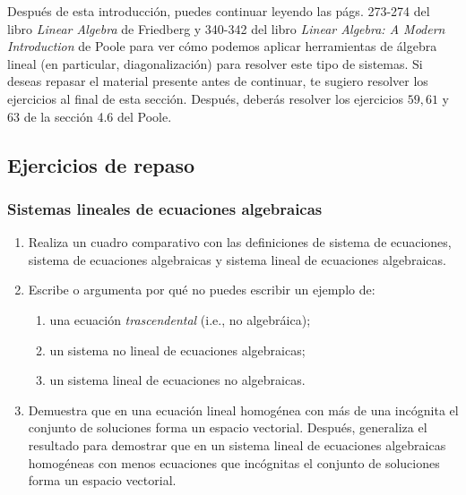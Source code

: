 \documentclass[12pt,libertine]{book}
\begin{document}
Después de esta introducción, puedes continuar leyendo las págs. 273-274 del libro \emph{Linear Algebra} de Friedberg y 340-342 del libro \emph{Linear Algebra: A Modern Introduction} de Poole para ver cómo podemos aplicar herramientas de álgebra lineal (en particular, diagonalización) para resolver este tipo de sistemas. Si deseas repasar el material presente antes de continuar, te sugiero resolver los ejercicios al final de esta sección. Después, deberás resolver los ejercicios $59, 61$ y $63$ de la sección 4.6 del Poole.

\subsection*{Ejercicios de repaso}

\subsubsection*{Sistemas lineales de ecuaciones algebraicas}
\begin{enumerate}
    \item Realiza un cuadro comparativo con las definiciones de sistema de ecuaciones, sistema de ecuaciones algebraicas y sistema lineal de ecuaciones algebraicas. 
    \item Escribe o argumenta por qué no puedes escribir un ejemplo de:
        \begin{enumerate}[label=\alph*)]
        \item una ecuación \emph{trascendental} (i.e., no algebráica);
        \item un sistema no lineal de ecuaciones algebraicas;
        \item un sistema lineal de ecuaciones no algebraicas.
    \end{enumerate}
    \item Demuestra que en una ecuación lineal homogénea con más de una incógnita el conjunto de soluciones forma un espacio vectorial. Después, generaliza el resultado para demostrar que en un sistema lineal de ecuaciones algebraicas homogéneas con menos ecuaciones que incógnitas el conjunto de soluciones forma un espacio vectorial.
\end{enumerate}
\end{document}
